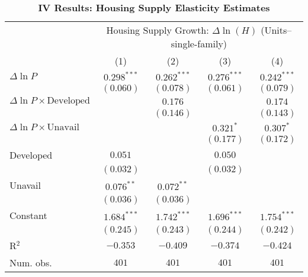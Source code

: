 
\begin{table}[H]
\caption{\textbf{IV Results: Housing Supply Elasticity Estimates}}
\begin{center}
\begin{scriptsize}
\begin{threeparttable}
\begin{tabular}{l c c c c}
\toprule
 & \multicolumn{4}{c}{Housing Supply Growth: $\Delta\ln(H)$ (Units--single-family)} \\
\cmidrule(lr){2-5}
 & (1) & (2) & (3) & (4) \\
\midrule
$\Delta\ln P$                         & $0.298^{***}$ & $0.262^{***}$ & $0.276^{***}$ & $0.242^{***}$ \\
                                      & $(0.060)$     & $(0.078)$     & $(0.061)$     & $(0.079)$     \\
$\Delta\ln P\times{\text{Developed}}$ &               & $0.176$       &               & $0.174$       \\
                                      &               & $(0.146)$     &               & $(0.143)$     \\
$\Delta\ln P\times{\text{Unavail}}$   &               &               & $0.321^{*}$   & $0.307^{*}$   \\
                                      &               &               & $(0.177)$     & $(0.172)$     \\
Developed                             & $0.051$       &               & $0.050$       &               \\
                                      & $(0.032)$     &               & $(0.032)$     &               \\
Unavail                               & $0.076^{**}$  & $0.072^{**}$  &               &               \\
                                      & $(0.036)$     & $(0.036)$     &               &               \\
Constant                              & $1.684^{***}$ & $1.742^{***}$ & $1.696^{***}$ & $1.754^{***}$ \\
                                      & $(0.245)$     & $(0.243)$     & $(0.244)$     & $(0.242)$     \\
\midrule
R$^2$                                 & $-0.353$      & $-0.409$      & $-0.374$      & $-0.424$      \\
Num. obs.                             & $401$         & $401$         & $401$         & $401$         \\

\end{tabular}
\end{threeparttable}
\end{scriptsize}
\end{center}
\end{table}
